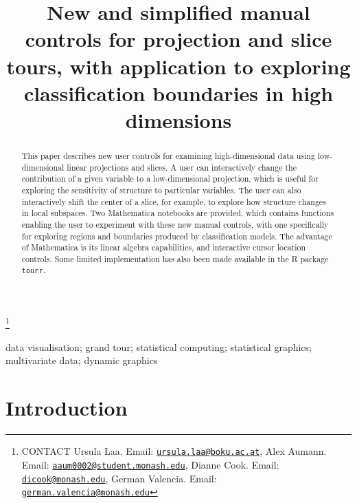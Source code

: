 \documentclass[]{interact}
\theoremstyle{plain}%
\theoremstyle{definition}
\theoremstyle{remark}
\begin{document}

\title{New and simplified manual controls for projection and slice
tours, with application to exploring classification boundaries in high
dimensions}


\author{
}

\thanks{CONTACT Ursula
Laa. Email: \href{mailto:ursula.laa@boku.ac.at}{\nolinkurl{ursula.laa@boku.ac.at}}, Alex
Aumann. Email: \href{mailto:aaum0002@student.monash.edu}{\nolinkurl{aaum0002@student.monash.edu}}, Dianne
Cook. Email: \href{mailto:dicook@monash.edu}{\nolinkurl{dicook@monash.edu}}, German
Valencia. Email: \href{mailto:german.valencia@monash.edu}{\nolinkurl{german.valencia@monash.edu}}}

\maketitle

\begin{abstract}
This paper describes new user controls for examining high-dimensional
data using low-dimensional linear projections and slices. A user can
interactively change the contribution of a given variable to a
low-dimensional projection, which is useful for exploring the
sensitivity of structure to particular variables. The user can also
interactively shift the center of a slice, for example, to explore how
structure changes in local subspaces. Two Mathematica notebooks are
provided, which contains functions enabling the user to experiment with
these new manual controls, with one specifically for exploring regions
and boundaries produced by classification models. The advantage of
Mathematica is its linear algebra capabilities, and interactive cursor
location controls. Some limited implementation has also been made
available in the R package \tt{tourr}. 
\end{abstract}

\begin{keywords}
data visualisation; grand tour; statistical computing; statistical
graphics; multivariate data; dynamic graphics
\end{keywords}

\hypertarget{introduction}{%
\section{Introduction}\label{introduction}}
\end{document}
